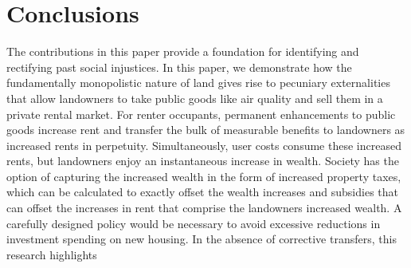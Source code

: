 \documentclass[ecta,nameyear,draft]{econsocart}
\theoremstyle{plain}
\theoremstyle{remark}
\begin{document}
\section{Conclusions}
The contributions in this paper provide a foundation for identifying and rectifying past social injustices. In this paper, we demonstrate how the fundamentally monopolistic nature of land gives rise to pecuniary externalities that allow landowners to take public goods like air quality and sell them in a private rental market. For renter occupants, permanent enhancements to public goods increase rent and transfer the bulk of measurable benefits to landowners as increased rents in perpetuity. Simultaneously, user costs consume these increased rents, but landowners enjoy an instantaneous increase in wealth. 
Society has the option of capturing the increased wealth in the form of increased property taxes, which can be calculated to exactly offset the wealth increases and subsidies that can offset the increases in rent that comprise the landowners increased wealth. A carefully designed policy would be necessary to avoid excessive reductions in investment spending on new housing.
In the absence of corrective transfers, this research highlights
 
\end{document}
